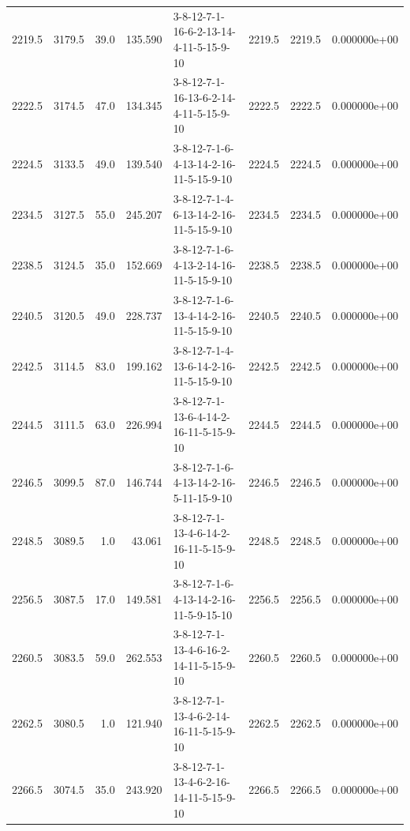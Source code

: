 \begin{tabular}{rrrrlrrr}
 2219.5 &  3179.5 &           39.0 &            135.590 &  3-8-12-7-1-16-6-2-13-14-4-11-5-15-9-10 &        2219.5 &          2219.5 &  0.000000e+00 \\
 2222.5 &  3174.5 &           47.0 &            134.345 &  3-8-12-7-1-16-13-6-2-14-4-11-5-15-9-10 &        2222.5 &          2222.5 &  0.000000e+00 \\
 2224.5 &  3133.5 &           49.0 &            139.540 &  3-8-12-7-1-6-4-13-14-2-16-11-5-15-9-10 &        2224.5 &          2224.5 &  0.000000e+00 \\
 2234.5 &  3127.5 &           55.0 &            245.207 &  3-8-12-7-1-4-6-13-14-2-16-11-5-15-9-10 &        2234.5 &          2234.5 &  0.000000e+00 \\
 2238.5 &  3124.5 &           35.0 &            152.669 &  3-8-12-7-1-6-4-13-2-14-16-11-5-15-9-10 &        2238.5 &          2238.5 &  0.000000e+00 \\
 2240.5 &  3120.5 &           49.0 &            228.737 &  3-8-12-7-1-6-13-4-14-2-16-11-5-15-9-10 &        2240.5 &          2240.5 &  0.000000e+00 \\
 2242.5 &  3114.5 &           83.0 &            199.162 &  3-8-12-7-1-4-13-6-14-2-16-11-5-15-9-10 &        2242.5 &          2242.5 &  0.000000e+00 \\
 2244.5 &  3111.5 &           63.0 &            226.994 &  3-8-12-7-1-13-6-4-14-2-16-11-5-15-9-10 &        2244.5 &          2244.5 &  0.000000e+00 \\
 2246.5 &  3099.5 &           87.0 &            146.744 &  3-8-12-7-1-6-4-13-14-2-16-5-11-15-9-10 &        2246.5 &          2246.5 &  0.000000e+00 \\
 2248.5 &  3089.5 &            1.0 &             43.061 &  3-8-12-7-1-13-4-6-14-2-16-11-5-15-9-10 &        2248.5 &          2248.5 &  0.000000e+00 \\
 2256.5 &  3087.5 &           17.0 &            149.581 &  3-8-12-7-1-6-4-13-14-2-16-11-5-9-15-10 &        2256.5 &          2256.5 &  0.000000e+00 \\
 2260.5 &  3083.5 &           59.0 &            262.553 &  3-8-12-7-1-13-4-6-16-2-14-11-5-15-9-10 &        2260.5 &          2260.5 &  0.000000e+00 \\
 2262.5 &  3080.5 &            1.0 &            121.940 &  3-8-12-7-1-13-4-6-2-14-16-11-5-15-9-10 &        2262.5 &          2262.5 &  0.000000e+00 \\
 2266.5 &  3074.5 &           35.0 &            243.920 &  3-8-12-7-1-13-4-6-2-16-14-11-5-15-9-10 &        2266.5 &          2266.5 &  0.000000e+00 \\

\end{tabular}
